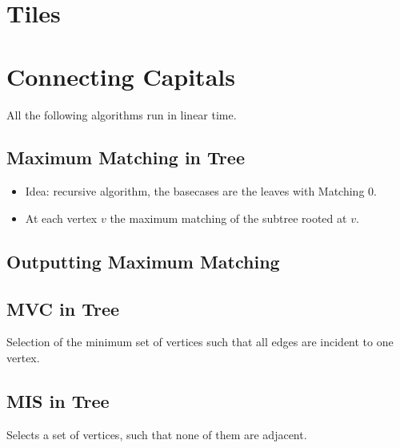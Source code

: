 \documentclass[a4paper, 10pt]{article}
\let\stdsection\section
\renewcommand\section{\newpage\stdsection}
\newcommand{\includecode}[1]{
    }
\begin{document}
    \section{Tiles}
        \includecode{../problems/w11/Tiles/Tiles1.cpp}
    
    \section{Connecting Capitals}
        All the following algorithms run in linear time.
        
        \subsection{Maximum Matching in Tree}
        \begin{itemize}
            \item Idea: recursive algorithm, the basecases are the leaves with Matching 0.
            \item At each vertex $v$ the maximum matching of the subtree rooted at $v$.
        \end{itemize}
        \includecode{../problems/w11/Connecting_Capitals/MaximumMatchingTree.cpp}
        
        \subsection{Outputting Maximum Matching}
        \includecode{../problems/w11/Connecting_Capitals/MaximumMatchingTreeOutput.cpp}
        
        \subsection{MVC in Tree}
        Selection of the minimum set of vertices such that all edges are incident to one vertex.
        \includecode{../problems/w11/Connecting_Capitals/MinimumVertexCoverTree.cpp}
        
        \subsection{MIS in Tree}
        Selects a set of vertices, such that none of them are adjacent.
        \includecode{../problems/w11/Connecting_Capitals/MaximumIndependentSetTree.cpp}
          
    
\end{document}
